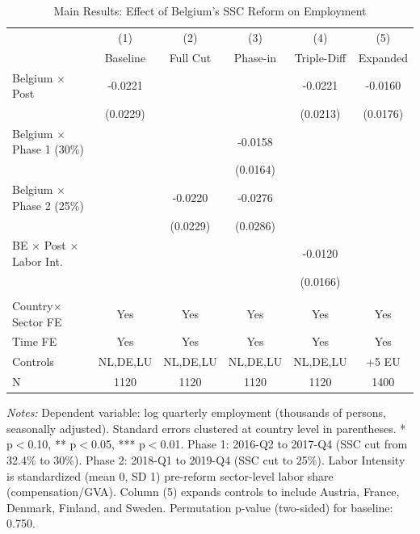 \begin{table}[H]
\centering
\caption{Main Results: Effect of Belgium's SSC Reform on Employment}
\begin{threeparttable}
\footnotesize
\begin{tabular}{lccccc}
\toprule
 & (1) & (2) & (3) & (4) & (5) \\
 & Baseline & Full Cut & Phase-in & Triple-Diff & Expanded \\
\midrule
Belgium $\times$ Post & -0.0221 & & & -0.0221 & -0.0160 \\
 & (0.0229) & & & (0.0213) & (0.0176) \\
Belgium $\times$ Phase 1 (30\%) & & & -0.0158 & & \\
 & & & (0.0164) & & \\
Belgium $\times$ Phase 2 (25\%) & & -0.0220 & -0.0276 & & \\
 & & (0.0229) & (0.0286) & & \\
BE $\times$ Post $\times$ Labor Int. & & & & -0.0120 & \\
 & & & & (0.0166) & \\
\\
Country$\times$Sector FE & Yes & Yes & Yes & Yes & Yes \\
Time FE & Yes & Yes & Yes & Yes & Yes \\
Controls & NL,DE,LU & NL,DE,LU & NL,DE,LU & NL,DE,LU & +5 EU \\
N & 1120 & 1120 & 1120 & 1120 & 1400 \\
\bottomrule
\end{tabular}
\begin{tablenotes}[flushleft]
\small
\item \textit{Notes:} Dependent variable: log quarterly employment (thousands of persons, seasonally adjusted). Standard errors clustered at country level in parentheses. * p$<$0.10, ** p$<$0.05, *** p$<$0.01. Phase 1: 2016-Q2 to 2017-Q4 (SSC cut from 32.4\% to 30\%). Phase 2: 2018-Q1 to 2019-Q4 (SSC cut to 25\%). Labor Intensity is standardized (mean 0, SD 1) pre-reform sector-level labor share (compensation/GVA). Column (5) expands controls to include Austria, France, Denmark, Finland, and Sweden. Permutation p-value (two-sided) for baseline: 0.750.
\end{tablenotes}
\end{threeparttable}
\label{tab:main}
\end{table}
